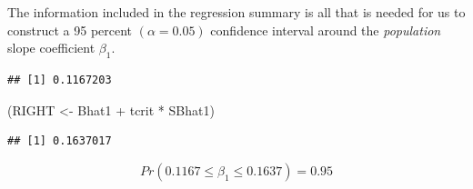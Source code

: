 \documentclass[
]{book}
\newenvironment{Shaded}{\begin{snugshade}}{\end{snugshade}}
\newcommand{\AttributeTok}[1]{\textcolor[rgb]{0.77,0.63,0.00}{#1}}
\newcommand{\CommentTok}[1]{\textcolor[rgb]{0.56,0.35,0.01}{\textit{#1}}}
\newcommand{\ConstantTok}[1]{\textcolor[rgb]{0.00,0.00,0.00}{#1}}
\newcommand{\DecValTok}[1]{\textcolor[rgb]{0.00,0.00,0.81}{#1}}
\newcommand{\FloatTok}[1]{\textcolor[rgb]{0.00,0.00,0.81}{#1}}
\newcommand{\FunctionTok}[1]{\textcolor[rgb]{0.00,0.00,0.00}{#1}}
\newcommand{\NormalTok}[1]{#1}
\newcommand{\OtherTok}[1]{\textcolor[rgb]{0.56,0.35,0.01}{#1}}
\newcommand{\SpecialCharTok}[1]{\textcolor[rgb]{0.00,0.00,0.00}{#1}}
\begin{document}
The information included in the regression summary is all that is needed for us to construct a 95 percent \((\alpha=0.05)\) confidence interval around the \emph{population} slope coefficient \(\beta_1\).

\begin{Shaded}
\end{Shaded}

\begin{verbatim}
## [1] 0.1167203
\end{verbatim}

\begin{Shaded}
\begin{Highlighting}[]
\NormalTok{(RIGHT }\OtherTok{\textless{}{-}}\NormalTok{ Bhat1 }\SpecialCharTok{+}\NormalTok{ tcrit }\SpecialCharTok{*}\NormalTok{ SBhat1)}
\end{Highlighting}
\end{Shaded}

\begin{verbatim}
## [1] 0.1637017
\end{verbatim}

\[Pr(0.1167 \leq \beta_1 \leq 0.1637)=0.95\]
\end{document}
